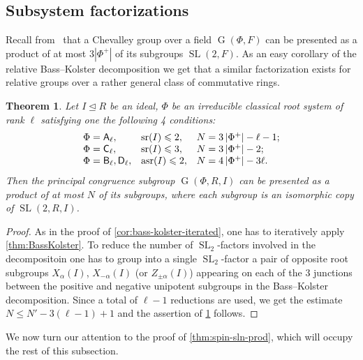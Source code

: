 \documentclass[11pt]{amsart}
\theoremstyle{plain}
\newtheorem{thm}{Theorem}
\numberwithin{equation}{section}
\numberwithin{lemma}{section}
\theoremstyle{definition}
\theoremstyle{remark}
\DeclareMathOperator{\G}{G}
\DeclareMathOperator{\SL}{SL}
\DeclareMathOperator{\sr}{sr}
\DeclareMathOperator{\asr}{asr}
\newcommand{\rA}{\mathsf{A}}
\newcommand{\rB}{\mathsf{B}}
\newcommand{\rC}{\mathsf{C}}
\newcommand{\rD}{\mathsf{D}}
\begin{document}
\subsection{Subsystem factorizations}\label{sec:subsysfact}
Recall from~\cite{LNS11, V13} that a Chevalley group over a field $\G(\Phi, F)$ can be presented as a product of at most $3|\Phi^+|$ of its subgroups $\SL(2, F)$.
As an easy corollary of the relative Bass--Kolster decomposition we get that a similar factorization exists for relative groups over a rather general class of commutative rings.
\begin{thm}\label{thm:SL2width}
Let $I\trianglelefteq R$ be an ideal, $\Phi$ be an irreducible classical root system of rank $\ell$ satisfying one the following 4 conditions:
\[\begin{array}{l@{\quad}l@{\quad}l}
\Phi=\rA_\ell, & \sr(I)\leqslant 2, & N=3\left|\Phi^+\right| - \ell - 1; \\
\Phi=\rC_\ell, & \sr(I)\leqslant 3, & N=3\left|\Phi^+\right| - 2; \\
\Phi=\rB_\ell, \rD_\ell, & \asr(I)\leqslant 2, & N=4\left|\Phi^+\right| - 3\ell.
\end{array}\]
Then the principal congruence subgroup $\G(\Phi, R, I)$ can be presented as a product of at most $N$ of its subgroups, 
 where each subgroup is an isomorphic copy of $\SL(2, R, I)$.
\end{thm}

\begin{proof}
 As in the proof of \cref{cor:bass-kolster-iterated}, one has to iteratively apply \cref{thm:BassKolster}.
 To reduce the number of $\SL_2$-factors involved in the decompositoin one has to group into a single $\SL_2$-factor a pair of opposite root subgroups $X_{\alpha}(I)$, $X_{-\alpha}(I)$ (or $Z_{\pm\alpha}(I)$) appearing on each
 of the $3$ junctions between the positive and negative unipotent subgroups in the Bass--Kolster decomposition.
 Since a total of $\ell-1$ reductions are used, we get the estimate $N \leq N' - 3(\ell - 1) + 1$ and the assertion of \cref{thm:SL2width} follows.
\end{proof}

We now turn our attention to the proof of \cref{thm:spin-sln-prod}, which will occupy the rest of this subsection.
\end{document}

